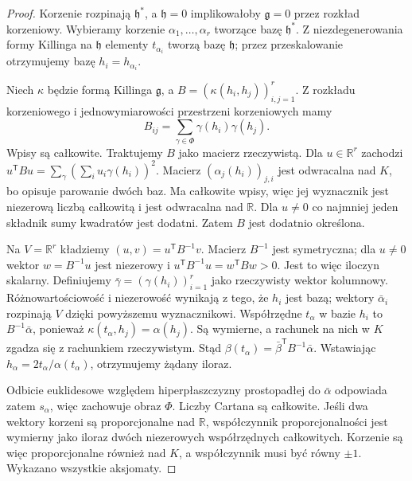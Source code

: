 \begin{proof}
Korzenie rozpinają $\mathfrak h^*$, a $\mathfrak h=0$ implikowałoby $\mathfrak g=0$ przez rozkład korzeniowy. Wybieramy korzenie $\alpha_1,\ldots,\alpha_r$ tworzące bazę $\mathfrak h^*$. Z niezdegenerowania formy Killinga na $\mathfrak h$ elementy $t_{\alpha_i}$ tworzą bazę $\mathfrak h$; przez przeskalowanie otrzymujemy bazę $h_i=h_{\alpha_i}$.

Niech $\kappa$ będzie formą Killinga $\mathfrak g$, a $B=(\kappa(h_i,h_j))_{i,j=1}^r$. Z rozkładu korzeniowego i jednowymiarowości przestrzeni korzeniowych mamy
\[
 B_{ij}=\sum_{\gamma\in\Phi}\gamma(h_i)\gamma(h_j).
\]
Wpisy są całkowite. Traktujemy $B$ jako macierz rzeczywistą. Dla $u\in\mathbb R^r$ zachodzi $u^{\mathsf T}Bu=\sum_\gamma(\sum_i u_i\gamma(h_i))^2$. Macierz $(\alpha_j(h_i))_{j,i}$ jest odwracalna nad $K$, bo opisuje parowanie dwóch baz. Ma całkowite wpisy, więc jej wyznacznik jest niezerową liczbą całkowitą i jest odwracalna nad $\mathbb R$. Dla $u\ne0$ co najmniej jeden składnik sumy kwadratów jest dodatni. Zatem $B$ jest dodatnio określona.

Na $V=\mathbb R^r$ kładziemy $(u,v)=u^{\mathsf T}B^{-1}v$. Macierz $B^{-1}$ jest symetryczna; dla $u\ne0$ wektor $w=B^{-1}u$ jest niezerowy i $u^{\mathsf T}B^{-1}u=w^{\mathsf T}Bw>0$. Jest to więc iloczyn skalarny. Definiujemy $\bar\gamma=(\gamma(h_i))_{i=1}^r$ jako rzeczywisty wektor kolumnowy. Różnowartościowość i niezerowość wynikają z tego, że $h_i$ jest bazą; wektory $\bar\alpha_i$ rozpinają $V$ dzięki powyższemu wyznacznikowi. Współrzędne $t_\alpha$ w bazie $h_i$ to $B^{-1}\bar\alpha$, ponieważ $\kappa(t_\alpha,h_j)=\alpha(h_j)$. Są wymierne, a rachunek na nich w $K$ zgadza się z rachunkiem rzeczywistym. Stąd $\beta(t_\alpha)=\bar\beta^{\mathsf T}B^{-1}\bar\alpha$. Wstawiając $h_\alpha=2t_\alpha/\alpha(t_\alpha)$, otrzymujemy żądany iloraz.

Odbicie euklidesowe względem hiperpłaszczyzny prostopadłej do $\bar\alpha$ odpowiada zatem $s_\alpha$, więc zachowuje obraz $\Phi$. Liczby Cartana są całkowite. Jeśli dwa wektory korzeni są proporcjonalne nad $\mathbb R$, współczynnik proporcjonalności jest wymierny jako iloraz dwóch niezerowych współrzędnych całkowitych. Korzenie są więc proporcjonalne również nad $K$, a współczynnik musi być równy $\pm1$. Wykazano wszystkie aksjomaty.
\end{proof}

